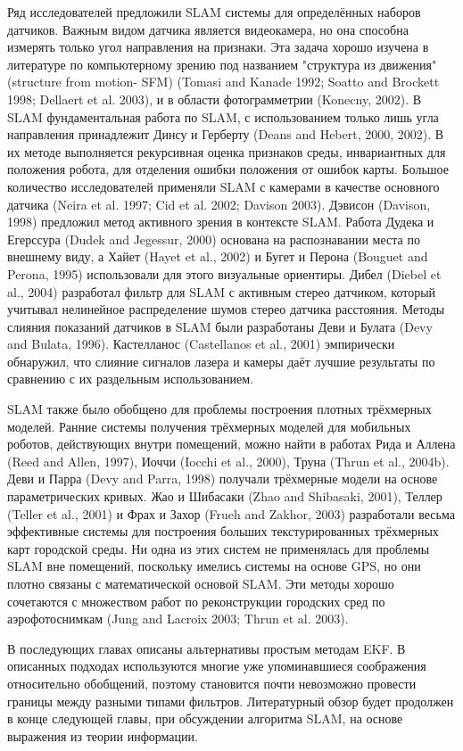 \documentclass[10pt,a4paper]{article}
\begin{document}
Ряд исследователей предложили SLAM системы для определённых наборов датчиков. Важным видом датчика является видеокамера, но она способна измерять только угол направления на признаки. Эта задача хорошо изучена в литературе по компьютерному зрению под названием "структура из движения" (structure from motion- SFM) (Tomasi and
Kanade 1992; Soatto and Brockett 1998; Dellaert et al. 2003), и в области фотограмметрии (Konecny, 2002). В SLAM фундаментальная работа по SLAM, с использованием только лишь угла направления принадлежит Динсу и Герберту (Deans and Hebert, 2000, 2002). В их методе выполняется рекурсивная оценка признаков среды, инвариантных для положения робота, для отделения ошибки положения от ошибок карты. Большое количество исследователей применяли SLAM с камерами в качестве основного датчика (Neira et al. 1997; Cid et al. 2002; Davison 2003). Дэвисон (Davison, 1998) предложил метод активного зрения в контексте SLAM. Работа Дудека и Егерссура (Dudek and Jegessur, 2000) основана на распознавании места по внешнему виду, а Хайет (Hayet et al., 2002) и Бугет и Перона (Bouguet and Perona, 1995) использовали для этого визуальные ориентиры. Дибел (Diebel et al., 2004) разработал фильтр для SLAM с активным стерео датчиком, который учитывал нелинейное распределение шумов стерео датчика расстояния. Методы слияния показаний датчиков в SLAM были разработаны Деви и Булата (Devy and Bulata, 1996). Кастелланос (Castellanos et al., 2001) эмпирически обнаружил, что слияние сигналов лазера и камеры даёт лучшие результаты по сравнению с их раздельным использованием.

SLAM также было обобщено для проблемы построения плотных трёхмерных моделей. Ранние системы получения трёхмерных моделей для мобильных роботов, действующих внутри помещений, можно найти в работах Рида и Аллена (Reed and Allen, 1997), Иоччи (Iocchi et al., 2000), Труна (Thrun et al., 2004b). Деви и Парра (Devy and Parra, 1998) получали трёхмерные модели на основе параметрических кривых. Жао и Шибасаки (Zhao and Shibasaki, 2001), Теллер (Teller et al., 2001) и Фрах и Захор (Frueh and Zakhor, 2003) разработали весьма эффективные системы для построения больших текстурированных  трёхмерных карт городской среды. Ни одна из этих систем не применялась для проблемы SLAM вне помещений, поскольку имелись системы на основе GPS, но они плотно связаны с математической основой SLAM. Эти методы хорошо сочетаются с множеством работ по реконструкции городских сред по аэрофотоснимкам (Jung and Lacroix 2003; Thrun et al. 2003).

В последующих главах описаны альтернативы простым методам EKF. В описанных подходах используются многие уже упоминавшиеся соображения относительно обобщений, поэтому становится почти невозможно провести границы между разными типами фильтров. Литературный обзор будет продолжен в конце следующей главы, при обсуждении алгоритма SLAM, на основе выражения из теории информации.\\
\end{document}

